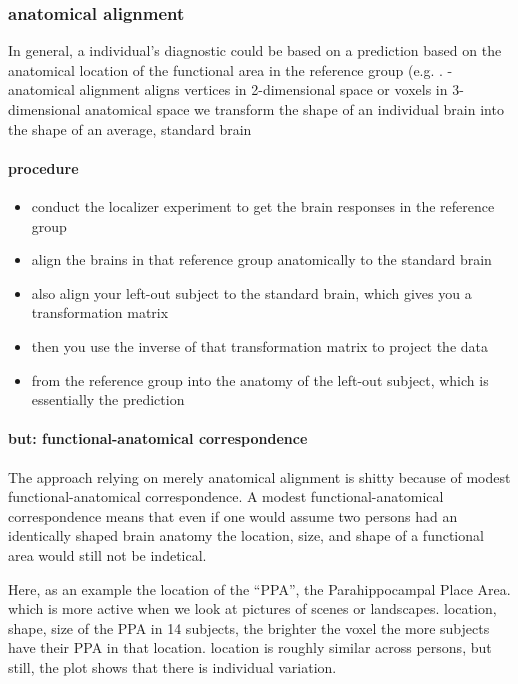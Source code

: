 \subsubsection{anatomical alignment}

In general, a individual's diagnostic could be based on a prediction based on
the anatomical location of the functional area in the reference group (e.g.
\citet{weiner2018defining}.
%
- anatomical alignment aligns vertices in 2-dimensional space or voxels in
3-dimensional anatomical space
%
we transform the shape of an individual brain into the shape of an average,
standard brain


\paragraph{procedure}
%
\begin{itemize}
    \item conduct the localizer experiment to get the brain responses in the
    reference group
    \item align the brains in that reference group anatomically to the standard
    brain
    \item also align your left-out subject to the standard brain, which gives
    you a transformation matrix
    \item then you use the inverse of that transformation matrix to project the
    data
    \item from the reference group into the anatomy of the left-out subject,
    which is essentially the prediction
\end{itemize}


\paragraph{but: functional-anatomical correspondence}
The approach relying on merely anatomical alignment is shitty because of modest
functional-anatomical correspondence.
A modest functional-anatomical correspondence means that even if one would assume
two persons had an identically shaped brain anatomy the location, size, and
shape of a functional area would still not be indetical.

Here, as an example the location of the ``PPA'', the Parahippocampal Place Area.
which is more active when we look at pictures of scenes or landscapes.
%
location, shape, size of the PPA in 14 subjects,
%
the brighter the voxel the more subjects have their PPA in that location.
%
location is roughly similar across persons, but still, the plot shows that there
is individual variation.


